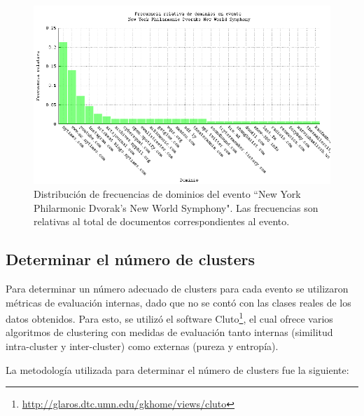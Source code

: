 \begin{figure}[h]
  \centering
  \includegraphics[width=14cm]{./img/dvorak-domain-freqs.png}
  \caption[Dominios evento 4]
   {Distribución de frecuencias de dominios del evento ``New York
  Philarmonic Dvorak's New World Symphony"\label{fig:dvorak-domains}. Las frecuencias son relativas al total de
  documentos correspondientes al evento.}
\end{figure}

\subsection{Determinar el número de clusters}
\label{sec-4.4.2}


Para determinar un número adecuado de clusters para cada evento se
utilizaron métricas de evaluación internas, dado que no se contó con
las clases reales de los datos obtenidos. Para esto, se utilizó el
software Cluto\footnote{\href{http://glaros.dtc.umn.edu/gkhome/views/cluto}{http://glaros.dtc.umn.edu/gkhome/views/cluto} }, el
cual ofrece varios algoritmos de clustering con medidas de evaluación
tanto internas (similitud intra-cluster y inter-cluster) como externas
(pureza y entropía).

La metodología utilizada para determinar el número de clusters fue la
siguiente:

